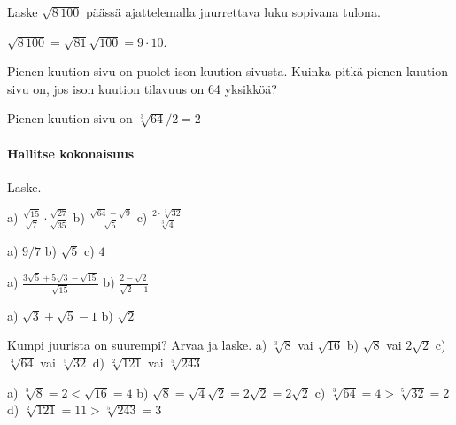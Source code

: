 \begin{tehtavasivu}
\begin{tehtava}
Laske $\sqrt{8\,100}$ päässä ajattelemalla juurrettava luku sopivana tulona.
\begin{vastaus}
$\sqrt{8\,100}=\sqrt{81}\sqrt{100}=9\cdot 10$.
\end{vastaus}
\end{tehtava}

\begin{tehtava}
Pienen kuution sivu on puolet ison kuution sivusta. Kuinka pitkä pienen kuution sivu on, jos ison kuution tilavuus on 64 yksikköä? \\
\begin{vastaus}
Pienen kuution sivu on $\sqrt[3]{64}/2=2$ 
\end{vastaus}
\end{tehtava}


\paragraph*{Hallitse kokonaisuus}

Laske.

\begin{tehtava}
a) $ \frac{\sqrt{15}}{\sqrt{7}} \cdot  \frac{\sqrt{27}}{\sqrt{35}}$  \quad b)  $ \frac{\sqrt{64}-\sqrt{9}}{\sqrt{5}}$   \quad c)  $ \frac{2 \cdot \sqrt[3]{32}}{\sqrt[3]{4}}$ \quad 
\begin{vastaus}
a) $9/7$ \quad b) $\sqrt{5}$ \quad c) $4$ \quad
\end{vastaus}
\end{tehtava}

\begin{tehtava} 
a) $ \frac{3\sqrt{5}+5\sqrt{3}-\sqrt{15}}{\sqrt{15}}$  \quad b)  $ \frac{2-\sqrt{2}}{\sqrt{2}-1}$   \quad
\begin{vastaus}
a) $\sqrt{3}+\sqrt{5}-1$ \quad b) $\sqrt{2}$ \quad
\end{vastaus}
\end{tehtava}

\begin{tehtava} Kumpi juurista on suurempi? Arvaa ja laske.
a) $\sqrt[3]{8}$ vai $\sqrt{16}$ \quad b)  $\sqrt{8}$ vai $2\sqrt{2}$  \quad c) $\sqrt[3]{64}$ vai $\sqrt[5]{32}$ \quad d) $\sqrt[2]{121}$ vai $\sqrt[5]{243}$ 
\begin{vastaus}
a) $\sqrt[3]{8}=2<\sqrt{16}=4$ \quad b) $\sqrt{8}=\sqrt{4}\sqrt{2}=2\sqrt{2} = 2\sqrt{2}$ \quad c) $\sqrt[3]{64}=4>\sqrt[5]{32}=2$ \quad d) $\sqrt[2]{121}=11 >\sqrt[5]{243}=3$ 
\end{vastaus}
\end{tehtava}



\end{tehtavasivu}
